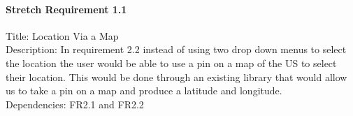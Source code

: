 \documentclass[onecolumn, draftclsnofoot,10pt, compsoc]{article}
\begin{document}
					\paragraph{Stretch Requirement 1.1}
						Title: Location Via a Map\\
						Description: In requirement 2.2 instead of using two drop down menus to select the location the user would be able to use a pin on a map of the US to select their location. This would be done through an existing library that would allow us to take a pin on a map and produce a latitude and longitude.\\
						Dependencies: FR2.1 and FR2.2\\
		
\end{document}
